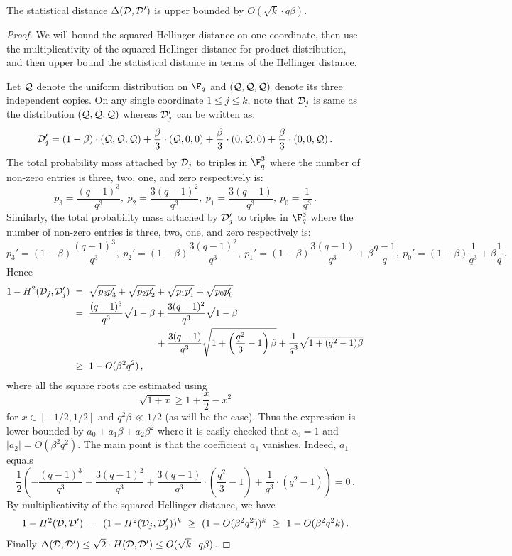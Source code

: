 \begin{lemma}\label{lemma:covering}  The statistical distance
$\Delta( {\cal D}, {\cal D'} )$ is upper bounded by $O(\sqrt{k}\cdot q\beta)$.
\end{lemma}
\begin{proof} We will bound the squared Hellinger distance on one coordinate, then
use the multiplicativity of the squared Hellinger distance for product distribution,
and then upper bound the statistical distance in terms of the Hellinger distance.

Let ${\cal Q}$ denote the uniform distribution on $\F_q$ and $({\cal Q}, {\cal Q}, {\cal Q})$
denote its three independent copies.
On any single coordinate $1 \leq j \leq k$,
note that ${\cal D}_j$ is same as the distribution $({\cal Q}, {\cal Q}, {\cal Q})$ whereas
${\cal D}'_j$ can be written as:
 $$ {\cal D}'_j = (1-\beta)\cdot ({\cal Q}, {\cal Q}, {\cal Q})+ \frac{\beta}{3} \cdot
 ({\cal Q}, 0, 0) + \frac{\beta}{3}\cdot (0, {\cal Q}, 0)+ \frac{\beta}{3} \cdot
 (0,0, {\cal Q})\,. $$
The total probability mass attached by ${\cal D}_j$ to triples in $\F_q^3$ where the
number of non-zero entries is three, two, one, and zero respectively is:
$$ p_3=\frac{(q-1)^3}{q^3}, \ p_2= \frac{3(q-1)^2}{q^3}, \ p_1=\frac{3(q-1)}{q^3}, \ p_0=\frac{1}{q^3}\,. $$
Similarly, the total probability mass attached by ${\cal D}'_j$ to triples in $\F_q^3$ where the
number of non-zero entries is three, two, one, and zero respectively is:
$$ p_3'=(1-\beta)\frac{(q-1)^3}{q^3}, \ p_2'=(1-\beta)\frac{3(q-1)^2}{q^3}, \ p_1'=(1-\beta)\frac{3(q-1)}{q^3}+
\beta \frac{q-1}{q}, \ p_0'=(1-\beta)\frac{1}{q^3}+ \beta \frac{1}{q}\,. $$
Hence
\begin{align*}
  1 - H^2({\cal D}_j, {\cal D}'_j )\
  &=\  \sqrt{p_3 p_3'} + \sqrt{p_2 p_2'} + \sqrt{p_1 p_1'} + \sqrt{p_0 p_0'} \\
  &=\  \frac{(q-1)^3}{q^3} \sqrt{1-\beta} + \frac{3(q-1)^2}{q^3}
  \sqrt{1-\beta}\\
  &\phantom{=\ \frac{(q-1)^3}{q^3} \sqrt{1-\beta}\ } +
  \frac{3(q-1)}{q^3} \sqrt{1+ \left(\frac{q^2}{3}-1\right)\beta} + \frac{1}{q^3} \sqrt{1+ (q^2-1)\beta} \\
  &\geq\ 1- O(\beta^2 q^2)\,,
\end{align*}
where all the square roots are estimated using
\[
\sqrt{1+x} \geq 1+\frac{x}{2}-x^2
\]
 for $x \in
[-{1}/{2},{1}/{2}]$
and $q^2 \beta \ll {1}/{2}$ (as will be the case). Thus the expression is
lower bounded by $a_0 + a_1 \beta + a_2 \beta^2$ where it is easily checked that
$a_0 =1 $ and $|a_2| = O(\beta^2 q^2)$.
The main point is that the coefficient $a_1$ vanishes. Indeed, $a_1$ equals
$$ \frac{1}{2} \left( - \frac{(q-1)^3}{q^3} -  \frac{3(q-1)^2}{q^3}
+  \frac{3(q-1)}{q^3} \cdot \left(\frac{q^2}{3}-1\right) +  \frac{1}{q^3} \cdot
  (q^2-1)  \right)   = 0\,.  $$
%
%
%
%
By multiplicativity of the squared Hellinger distance, we have
 $$ 1- H^2({\cal D}, {\cal D}') \ = \ (1- H^2({\cal D}_j, {\cal D}'_j))^{k}
 \ \geq \
 (1-O(\beta^2 q^2))^{k} \ \geq \ 1-O(\beta^2 q^2k)\,.$$
Finally $\Delta({\cal D}, {\cal D}') \leq  \sqrt{2} \cdot
 H({\cal D}, {\cal D}') \leq O(\sqrt{k} \cdot q\beta)$.
\end{proof}



